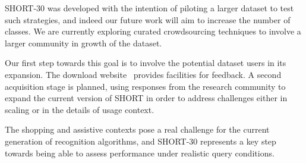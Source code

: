 SHORT-30 was developed with the intention of piloting a larger dataset to test such strategies, and indeed our future work will aim to increase the number of classes. We are currently exploring curated crowdsourcing techniques to involve a larger community in growth of the dataset.

Our first step towards this goal is to involve the potential dataset users in its expansion. The download website~\cite{Rivera-Rubio} provides facilities for feedback.  A second acquisition stage is planned, using responses from the research community to expand the current version of SHORT in order to address challenges either in scaling or in the details of usage context.

The shopping and assistive contexts pose a real challenge for the current generation of recognition algorithms, and SHORT-30 represents a key step towards being able to assess performance under realistic query conditions.




